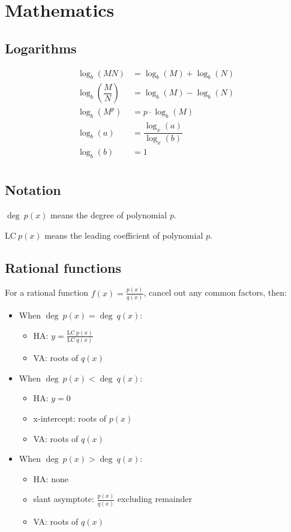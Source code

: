 \chapter{Mathematics}

\section{Logarithms}

\[\begin{aligned}
	\log_b(MN)&=\log_b(M)+\log_b(N) \\
	\log_b\left(\dfrac{M}{N}\right)&=\log_b(M)-\log_b(N) \\
	\log_b(M^p)&=p\cdot\log_b(M) \\
	\log_{b}(a)&=\dfrac{\log_{x}(a)}{\log_{x}(b)} \\
	\log_b(b)&=1 \\
\end{aligned}\]

\section{Notation}

$\deg~p(x)$ means the degree of polynomial $p$.

$\text{LC}~p(x)$ means the leading coefficient of polynomial $p$.

\section{Rational functions}

For a rational function $f(x) = \frac{p(x)}{q(x)}$, cancel out any common factors, then:

\begin{itemize}
	\item When $\deg~p(x) = \deg~q(x)$:
	\begin{itemize}
		\item HA: $y = \frac{\text{LC}~p(x)}{\text{LC}~q(x)}$
		\item VA: roots of $q(x)$
	\end{itemize}
	\item When $\deg~p(x) < \deg~q(x)$:
	\begin{itemize}
		\item HA: $y = 0$
		\item x-intercept: roots of $p(x)$
		\item VA: roots of $q(x)$
	\end{itemize}
	\item When $\deg~p(x) > \deg~q(x)$:
	\begin{itemize}
		\item HA: none
		\item slant asymptote: $\frac{p(x)}{q(x)}$ excluding remainder
		\item VA: roots of $q(x)$
	\end{itemize}
\end{itemize}

